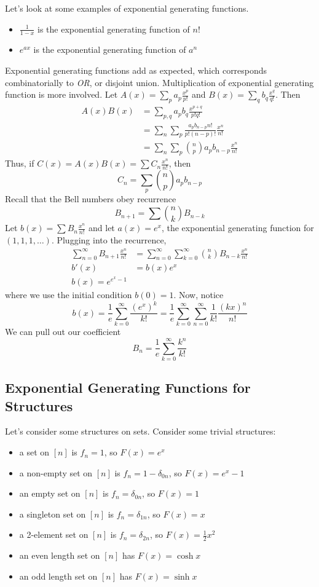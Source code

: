 Let's look at some examples of exponential generating functions.
\begin{itemize}
    \item $\frac{1}{1-x}$ is the exponential generating function of $n!$
    \item $e^{a x}$ is the exponential generating function of $a^{n}$
\end{itemize}
Exponential generating functions add as expected, which corresponds 
combinatorially to \emph{OR}, or disjoint union. Multiplication of
exponential generating function is more involved. 
Let $A(x)=\sum_{p} a_{p} \frac{x^{p}}{p!}$ and $B(x)=\sum_{q} b_{q} \frac{x^{q}}{q!}$. 
Then
\begin{align*}
    A(x) B(x) & =\sum_{p, q} a_{p} b_{q} \frac{x^{p+q}}{p ! q !} \\
& =\sum_{n} \sum_{p} \frac{a_{p} b_{n-p} n !}{p !(n-p) !} \frac{x^{n}}{n !} \\
& =\sum_{n} \sum_{p} \binom n p a_p b_{n-p} \frac{x^n}{n!}
\end{align*}
Thus, if $C(x)=A(x) B(x)=\sum C_{n} \frac{x^{n}}{n !}$, then
\[
    C_n = \sum_p \binom n p a_p b_{n-p}
\]
Recall that the Bell numbers obey recurrence
\[
    B_{n+1} = \sum \binom n k B_{n-k}
\]
Let $b(x)=\sum B_{n} \frac{x^{n}}{n !}$ and let $a(x)=e^{x}$, 
the exponential generating function for $(1,1,1, \ldots)$. 
Plugging into the recurrence,
\begin{align*}
    \sum_{n=0}^{\infty} B_{n+1} \frac{x^{n}}{n !} & =\sum_{n=0}^{\infty} \sum_{k=0}^{\infty} \binom n k B_{n-k} \frac{x^n}{n!} \\
    b'(x) &= b(x) e^x \\ 
    b(x) = e^{e^x - 1} &
\end{align*}
where we use the initial condition $b(0)=1$. Now, notice
\[
    b(x)=\frac{1}{e} \sum_{k=0}^{\infty} \frac{\left(e^{x}\right)^{k}}{k !}=\frac{1}{e} \sum_{k=0}^{\infty} \sum_{n=0}^{\infty} \frac{1}{k !} \frac{(k x)^{n}}{n !}
\]
We can pull out our coefficient
\[
B_{n}=\frac{1}{e} \sum_{k=0}^{\infty} \frac{k^{n}}{k !}
\]

\subsection{Exponential Generating Functions for Structures}
Let's consider some structures on sets. Consider some trivial structures:
\begin{itemize}
    \item a set on $[n]$ is $f_{n}=1$, so $F(x)=e^{x}$
    \item a non-empty set on $[n]$ is $f_{n}=1-\delta_{0 n}$, so $F(x)=e^{x}-1$
    \item an empty set on $[n]$ is $f_{n}=\delta_{0 n}$, so $F(x)=1$
    \item a singleton set on $[n]$ is $f_{n}=\delta_{1 n}$, so $F(x)=x$
    \item a 2-element set on $[n]$ is $f_{n}=\delta_{2 n}$, so $F(x)=\frac{1}{2} x^{2}$
    \item an even length set on $[n]$ has $F(x)=\cosh x$
    \item an odd length set on $[n]$ has $F(x)=\sinh x$
\end{itemize}

